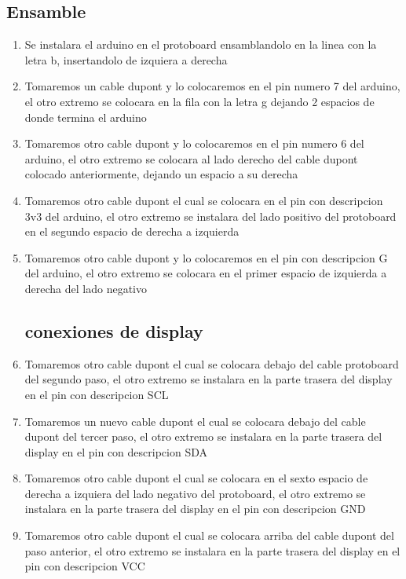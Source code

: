 \subsection{Ensamble}
\begin{enumerate}
    \item Se instalara el arduino en el protoboard ensamblandolo en la linea con la letra b, insertandolo de izquiera a derecha 
    \item Tomaremos un cable dupont y lo colocaremos en el pin numero 7 del arduino, el otro extremo se colocara en la fila con la letra g dejando 2 espacios de donde termina el arduino
    \item Tomaremos otro cable dupont y lo colocaremos en el pin numero 6 del arduino, el otro extremo se colocara al lado derecho del cable dupont colocado anteriormente, dejando un espacio a su derecha
    \item Tomaremos otro cable dupont el cual se colocara en el pin con descripcion 3v3 del arduino, el otro extremo se instalara del lado positivo del protoboard en el segundo espacio de derecha a izquierda 
    \item Tomaremos otro cable dupont y lo colocaremos en el pin con descripcion G del arduino, el otro extremo se colocara en el primer espacio de izquierda a derecha del lado negativo 
\subsection{conexiones de display}   
    \item Tomaremos otro cable dupont el cual se colocara debajo del cable protoboard del segundo paso, el otro extremo se instalara en la parte trasera del display en el pin con descripcion SCL
    \item Tomaremos un nuevo cable dupont el cual se colocara debajo del cable dupont del tercer paso, el otro extremo se instalara en la parte trasera del display en el pin con descripcion SDA
    \item Tomaremos otro cable dupont el cual se colocara en el sexto espacio de derecha a izquiera del lado negativo del protoboard, el otro extremo se instalara en la parte trasera del display en el pin con descripcion GND
    \item Tomaremos otro cable dupont el cual se colocara arriba del cable dupont del paso anterior, el otro extremo se instalara en la parte trasera del display en el pin con descripcion VCC

\end{enumerate}

